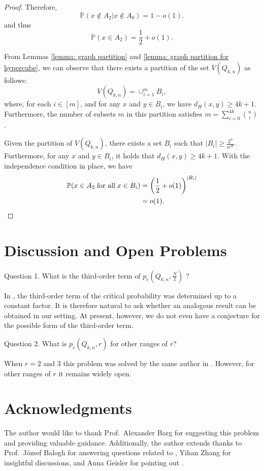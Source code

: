 \documentclass[reqno,11pt]{amsart}
\renewcommand{\geq}{\geqslant}
\begin{document}
\begin{proof}
Therefore, $$\mathbb{P}(x \notin A_2 | x \notin A_0)=1-o(1).$$ and thus $$\mathbb{P}(x \in A_2)= \frac{1}{2}+o(1).$$





From Lemmas \ref{lemma: graph partition} and \ref{lemma: graph partition for hypercube}, we can observe that there exists a partition of the set $V(Q_{k,n})$ as follows:
$$V(Q_{k,n})= \cup_{i=1}^m B_i,$$
where, for each $i \in [m]$, and for any $x$ and $y \in B_i$, we have $d_H(x,y) \geq 4k+1$. Furthermore, the number of subsets $m$ in this partition satisfies $m=\sum_{i=0}^{4k}\binom{n}{i}$.

Given the partition of $V(Q_{k,n})$, there exists a set $B_i$ such that $|B_i| \geq \frac{2^n}{n^{4k}}.$ Furthermore, for any $x$ and $y \in B_i$, it holds that $d_H(x,y) \geq 4k+1$. With the independence condition in place, we have 
\begin{align*}
\mathbb{P}(x \in A_2 \; \text{for all} \;  x \in B_i) &=\left(\frac{1}{2}+o(1)\right)^{|B_i|}\\
&= o(1). \qedhere
\end{align*}
\end{proof}

\section{Discussion and Open Problems}

Question 1. What is the third-order term of $p_c(Q_{k,n},\frac{N}{2})$ ?

In \cite{balogh_bollobas_morris_2009}, the third-order term of the critical probability was determined up to a constant factor. It is therefore natural to ask whether an analogous result can be obtained in our setting. At present, however, we do not even have a conjecture for the possible form of the third-order term.

Question 2. What is $p_c(Q_{k,n},r)$ for other ranges of $r$?

 When $r=2$ and $3$ this problem was solved by the same author in \cite{zhu2026bootstrappercolationgeneralizedhamming}. However, for other ranges of $r$ it remains widely open. 


\section*{Acknowledgments}
The author would like to thank Prof.~Alexander Barg for suggesting this problem and providing valuable guidance. Additionally, the author extends thanks to
Prof.~J{\'o}zsef Balogh for answering questions related to \cite{balogh_bollobas_morris_2009}, Yihan Zhang for insightful discussions, and Anna Geisler for pointing out \cite{collares2024universalbehaviourmajoritybootstrap}.
\end{document}
